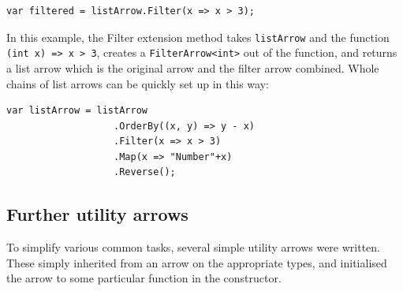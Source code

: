 \documentclass[12pt,twoside,notitlepage]{report}
\begin{document}
\begin{lstlisting}[language={[Sharp]C}]
var filtered = listArrow.Filter(x => x > 3);
\end{lstlisting}

In this example, the Filter extension method takes \texttt{listArrow} and the function \texttt{(int x) => x > 3}, creates a \texttt{FilterArrow<int>} out of the function, and returns a list arrow which is the original arrow and the filter arrow combined. Whole chains of list arrows can be quickly set up in this way:

\begin{lstlisting}[language={[Sharp]C}]
var listArrow = listArrow
                   .OrderBy((x, y) => y - x)
                   .Filter(x => x > 3)
                   .Map(x => "Number"+x)
                   .Reverse();
\end{lstlisting}




\subsection{Further utility arrows} \label{sec:further_utility_arrows}

To simplify various common tasks, several simple utility arrows were written. These simply inherited from an arrow on the appropriate types, and initialised the arrow to some particular function in the constructor.
\end{document}

